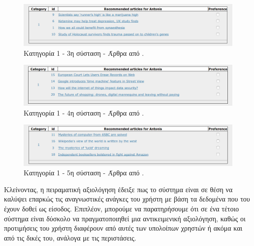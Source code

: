 \begin{figure}[!ht] \centering
\centerline{
    \includegraphics[scale=0.43]{static/figures/category/1c.png}}
    \caption{Κατηγορία {\en {\#}}1 - 3η σύσταση - Άρθρα από {} .}
    \label{}
\end{figure} 
\begin{figure}[!ht] \centering
\centerline{
    \includegraphics[scale=0.43]{static/figures/category/1d.png}}
    \caption{Κατηγορία {\en {\#}}1 - 4η σύσταση - Άρθρα από {} .}
    \label{}
\end{figure} 

\begin{figure}[!ht] \centering
\centerline{
    \includegraphics[scale=0.43]{static/figures/category/1e.png}}
    \caption{Κατηγορία {\en {\#}}1 - 5η σύσταση - Άρθρα από {} .}
    \label{}
\end{figure} 

\newpage 

Κλείνοντας, η πειραματική αξιολόγηση έδειξε πως το σύστημα είναι σε θέση 
να καλύψει επαρκώς τις αναγνωστικές ανάγκες του χρήστη με βάση τα δεδομένα 
που του έχουν δοθεί ως είσοδος. 
Επιπλέον, μπορούμε να παρατηρήσουμε ότι σε ένα τέτοιο σύστημα 
είναι δύσκολο να πραγματοποιηθεί μια αντικειμενική αξιολόγηση, 
καθώς οι προτιμήσεις του χρήστη διαφέρουν από αυτές των υπολοίπων χρηστών 
ή ακόμα και από τις δικές του, ανάλογα με τις περιστάσεις. 

